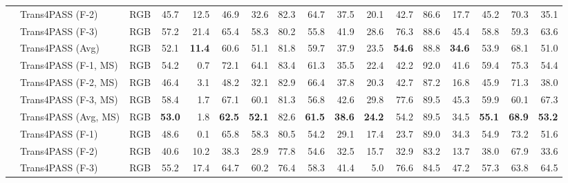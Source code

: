 \documentclass[final]{cvpr}
\newcommand{\grow}[1]{\textcolor{graytablerow}{#1}}
\begin{document}
\begin{table*}[!t]
\begin{center}
{\begin{tabular}{c@{}|l|c| c | r r r r r r r r r r r r r}
    & \grow{Trans4PASS (F-2)} & \grow{RGB} & \grow{45.7} & \grow{12.5} & \grow{46.9} & \grow{32.6} & \grow{82.3} & \grow{64.7} & \grow{37.5} & \grow{20.1} & \grow{42.7} & \grow{86.6} & \grow{17.7} & \grow{45.2} & \grow{70.3} & \grow{35.1}\\
    & \grow{Trans4PASS (F-3)} & \grow{RGB} & \grow{57.2} & \grow{21.4} & \grow{65.4} & \grow{58.3} & \grow{80.2} & \grow{55.8} & \grow{41.9} & \grow{28.6} & \grow{76.3} & \grow{88.6} & \grow{45.4} & \grow{58.8} & \grow{59.3} & \grow{63.6}\\
    &Trans4PASS (Avg) & RGB& 52.1 & \textbf{11.4} & 60.6 & 51.1 & 81.8 & 59.7 & 37.9 & 23.5 & \textbf{54.6} & 88.8 & \textbf{34.6} & 53.9 & 68.1 & 51.0\\
    & \grow{Trans4PASS (F-1, MS)} & \grow{RGB} & \grow{54.2} & \grow{0.7} & \grow{72.1} & \grow{64.1} & \grow{83.4} & \grow{61.3} & \grow{35.5} & \grow{22.4} & \grow{42.2} & \grow{92.0} & \grow{41.6} & \grow{59.4} & \grow{75.3} & \grow{54.4}\\
    & \grow{Trans4PASS (F-2, MS)} & \grow{RGB} & \grow{46.4} & \grow{3.1} & \grow{48.2} & \grow{32.1} & \grow{82.9} & \grow{66.4} & \grow{37.8} & \grow{20.3} & \grow{42.7} & \grow{87.2} & \grow{16.8} & \grow{45.9} & \grow{71.3} & \grow{38.0}\\
    & \grow{Trans4PASS (F-3, MS)} & \grow{RGB} & \grow{58.4} & \grow{1.7} & \grow{67.1} & \grow{60.1} & \grow{81.3} & \grow{56.8} & \grow{42.6} & \grow{29.8} & \grow{77.6} & \grow{89.5} & \grow{45.3} & \grow{59.9} & \grow{60.1} & \grow{67.3}\\
    \rowcolor{gray!15}\cellcolor{white} &Trans4PASS (Avg, MS) & RGB& \textbf{53.0} & 1.8 & \textbf{62.5} & \textbf{52.1} & 82.6 & \textbf{61.5} & \textbf{38.6} & \textbf{24.2} & 54.2 & 89.5 & 34.5 & \textbf{55.1} & \textbf{68.9} & \textbf{53.2}\\
    \midrule
    {\multirow{12}{*}{\rotatebox[origin=c]{90}{\textit{UDA}}}}
    & \grow{Trans4PASS (F-1)} & \grow{RGB} & \grow{48.6} & \grow{0.1} & \grow{65.8} & \grow{58.3} & \grow{80.5} & \grow{54.2} & \grow{29.1} & \grow{17.4} & \grow{23.7} & \grow{89.0} & \grow{34.3} & \grow{54.9} & \grow{73.2} & \grow{51.6}\\
    & \grow{Trans4PASS (F-2)} & \grow{RGB} & \grow{40.6} & \grow{10.2} & \grow{38.3} & \grow{28.9} & \grow{77.8} & \grow{54.6} & \grow{32.5} & \grow{15.7} & \grow{32.9} & \grow{83.2} & \grow{13.7} & \grow{38.0} & \grow{67.9} & \grow{33.6}\\
    & \grow{Trans4PASS (F-3)} & \grow{RGB} & \grow{55.2} & \grow{17.4} & \grow{64.7} & \grow{60.2} & \grow{76.4} & \grow{58.3} & \grow{41.4} & \grow{5.0} & \grow{76.6} & \grow{84.5} & \grow{47.2} & \grow{57.3} & \grow{63.8} & \grow{64.5}\\

\end{tabular}}
\end{center}
\end{table*}
\end{document}
